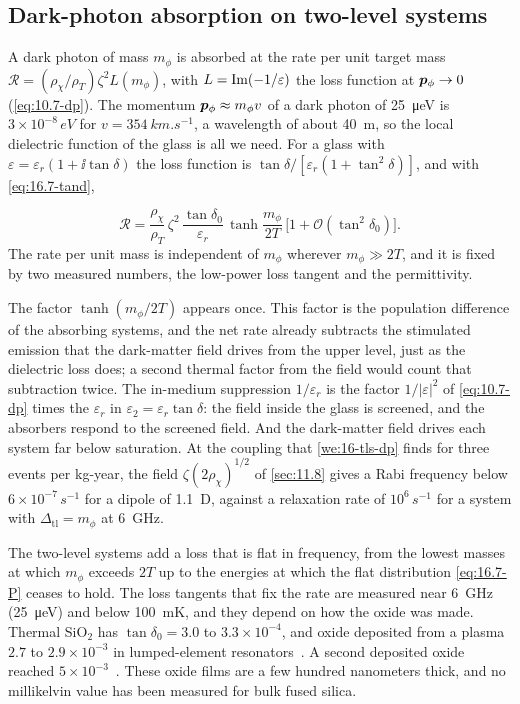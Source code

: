 \subsection{Dark-photon absorption on two-level systems}\label{sec:16.7-dp}

A dark photon of mass $m_\phi$ is absorbed at the rate per unit target mass $\mathcal{R} = (\rho_\chi/\rho_T)\zeta^2L(m_\phi)$, with $L = \operatorname{Im}(-1/\varepsilon)$ the loss function at $\bm{p}_\phi \to 0$ (\cref{eq:10.7-dp}). The momentum $\bm{p}_\phi \approx m_\phi v$ of a dark photon of \SI{25}{\micro eV} is $3\times10^{-8}\,\si{eV}$ for $v = \SI{354}{km.s^{-1}}$, a wavelength of about \SI{40}{m}, so the local dielectric function of the glass is all we need. For a glass with $\varepsilon = \varepsilon_r(1 + \ii\tan\delta)$ the loss function is $\tan\delta/[\varepsilon_r(1 + \tan^2\delta)]$, and with \cref{eq:16.7-tand},
\begin{keyresult}
\begin{equation}
  \mathcal{R} = \frac{\rho_\chi}{\rho_T}\,\zeta^2\,\frac{\tan\delta_0}{\varepsilon_r}\,\tanh\frac{m_\phi}{2T}\,\bigl[1 + \mathcal{O}(\tan^2\delta_0)\bigr] .
  \label{eq:16.7-dp}
\end{equation}
The rate per unit mass is independent of $m_\phi$ wherever $m_\phi \gg 2T$, and it is fixed by two measured numbers, the low-power loss tangent and the permittivity.
\end{keyresult}
\noindent The factor $\tanh(m_\phi/2T)$ appears once. This factor is the population difference of the absorbing systems, and the net rate already subtracts the stimulated emission that the dark-matter field drives from the upper level, just as the dielectric loss does; a second thermal factor from the field would count that subtraction twice. The in-medium suppression $1/\varepsilon_r$ is the factor $1/|\varepsilon|^2$ of \cref{eq:10.7-dp} times the $\varepsilon_r$ in $\varepsilon_2 = \varepsilon_r\tan\delta$: the field inside the glass is screened, and the absorbers respond to the screened field. And the dark-matter field drives each system far below saturation. At the coupling that \cref{we:16-tls-dp} finds for three events per kg-year, the field $\zeta(2\rho_\chi)^{1/2}$ of \cref{sec:11.8} gives a Rabi frequency below $6\times10^{-7}\,\si{s^{-1}}$ for a dipole of \SI{1.1}{D}, against a relaxation rate of $10^6\,\si{s^{-1}}$ for a system with $\Delta_{\mathrm{tl}} = m_\phi$ at \SI{6}{GHz}.

The two-level systems add a loss that is flat in frequency, from the lowest masses at which $m_\phi$ exceeds $2T$ up to the energies at which the flat distribution \cref{eq:16.7-P} ceases to hold. The loss tangents that fix the rate are measured near \SI{6}{GHz} (\SI{25}{\micro eV}) and below \SI{100}{mK}, and they depend on how the oxide was made. Thermal SiO$_2$ has $\tan\delta_0 = 3.0$ to $3.3\times10^{-4}$, and oxide deposited from a plasma $2.7$ to $2.9\times10^{-3}$ in lumped-element resonators~\cite[Table~I]{oconnell2008microwave}. A second deposited oxide reached $5\times10^{-3}$~\cite{martinis2005decoherence}. These oxide films are a few hundred nanometers thick, and no millikelvin value has been measured for bulk fused silica.

